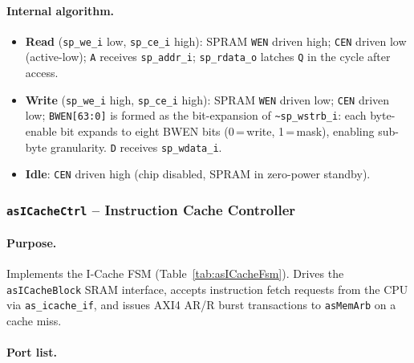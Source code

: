 \paragraph{Internal algorithm.}
\begin{itemize}
  \item \textbf{Read} (\texttt{sp\_we\_i} low, \texttt{sp\_ce\_i} high):
    SPRAM \texttt{WEN} driven high; \texttt{CEN} driven low (active-low);
    \texttt{A} receives \texttt{sp\_addr\_i};
    \texttt{sp\_rdata\_o} latches \texttt{Q} in the cycle after access.
  \item \textbf{Write} (\texttt{sp\_we\_i} high, \texttt{sp\_ce\_i} high):
    SPRAM \texttt{WEN} driven low; \texttt{CEN} driven low;
    \texttt{BWEN[63:0]} is formed as the bit-expansion of
    \texttt{\textasciitilde sp\_wstrb\_i}: each byte-enable bit expands to
    eight BWEN bits (0\,=\,write, 1\,=\,mask), enabling sub-byte
    granularity.
    \texttt{D} receives \texttt{sp\_wdata\_i}.
  \item \textbf{Idle}: \texttt{CEN} driven high (chip disabled, SPRAM
    in zero-power standby).
\end{itemize}

\subsubsection{\texttt{asICacheCtrl} -- Instruction Cache Controller}
\label{subsubsec:asICacheCtrl}

\paragraph{Purpose.}
Implements the I-Cache FSM (Table~\ref{tab:asICacheFsm}).
Drives the \texttt{asICacheBlock} SRAM interface, accepts instruction
fetch requests from the CPU via \texttt{as\_icache\_if}, and issues
AXI4 AR/R burst transactions to \texttt{asMemArb} on a cache miss.

\paragraph{Port list.}

